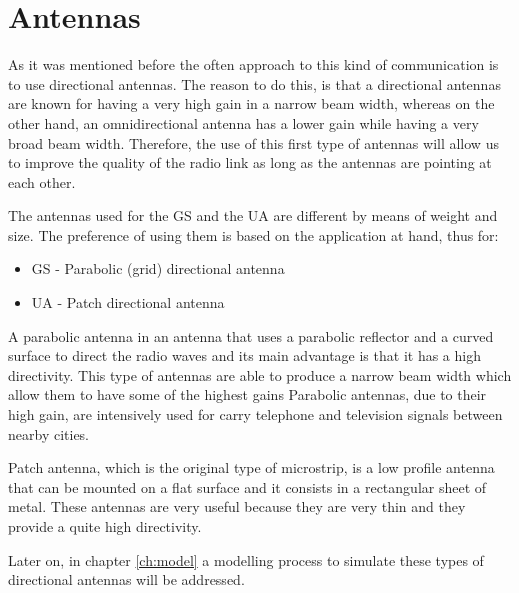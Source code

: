 \section{Antennas}\label{sec:antennas}

As it was mentioned before the often approach to this kind of communication is to use directional antennas.
The reason to do this, is that a directional antennas are known for having a very high gain in a narrow beam width, whereas on the other hand, an omnidirectional antenna has a lower gain while having a very broad beam width.
Therefore, the use of this first type of antennas will allow us to improve the quality of the radio link as long as the antennas are pointing at each other.

The antennas used for the GS and the UA are different by means of weight and size. The preference of using them is based on the application at hand, thus for:
\begin{itemize}
	\item GS - Parabolic (grid) directional antenna 
	\item UA - Patch directional antenna
\end{itemize}

A parabolic antenna in an antenna that uses a parabolic reflector and a curved surface to direct the radio waves and its main advantage is that it has a high directivity. This type of antennas are able to produce a narrow beam width which allow them to have some of the highest gains Parabolic antennas, due to their high gain, are intensively used for carry telephone and television signals between nearby cities.

Patch antenna, which is the original type of microstrip, is a low profile antenna that can be mounted on a flat surface and it consists in a rectangular sheet of metal. These antennas are very useful because they are very thin and they provide a quite high directivity.

Later on, in chapter \ref{ch:model} a modelling process to simulate these types of directional antennas will be addressed.